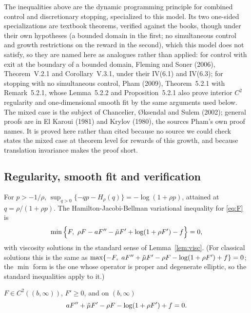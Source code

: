 \begin{aremark}
The inequalities above are the dynamic programming principle for combined control and discretionary stopping, specialized to this model. Its two one-sided specializations are textbook theorems, verified against the books, though under their own hypotheses (a bounded domain in the first; no simultaneous control and growth restrictions on the reward in the second), which this model does not satisfy, so they are named here as analogues rather than applied: for control with exit at the boundary of a bounded domain, Fleming and Soner (2006), Theorem~V.2.1 and Corollary~V.3.1, under their IV(6.1) and IV(6.3); for stopping with no simultaneous control, Pham (2009), Theorem~5.2.1 with Remark~5.2.1, whose Lemma~5.2.2 and Proposition~5.2.1 also prove interior $C^2$ regularity and one-dimensional smooth fit by the same arguments used below. The mixed case is the subject of Chancelier, \O ksendal and Sulem (2002); general proofs are in El Karoui (1981) and Krylov (1980), the sources Pham's own proof names. It is proved here rather than cited because no source we could check states the mixed case at theorem level for rewards of this growth, and because translation invariance makes the proof short.
\end{aremark}

\subsection{Regularity, smooth fit and verification}

For $p>-1/\rho$, $\sup_{q>0}\{-qp-H_\rho(q)\}=-\log(1+\rho p)$, attained at $q=\rho/(1+\rho p)$. The Hamilton-Jacobi-Bellman variational inequality for \eqref{eq:F} is
\begin{equation}
\min\Big\{F,\ \rho F-aF''-\tilde\mu F'+\log(1+\rho F')-f\Big\}=0 , \label{eq:HJB}
\end{equation}
with viscosity solutions in the standard sense of Lemma~\ref{lem:visc}. (For classical solutions this is the same as $\max\{-F,\ aF''+\tilde\mu F'-\rho F-\log(1+\rho F')+f\}=0$; the $\min$ form is the one whose operator is proper and degenerate elliptic, so the standard inequalities apply to it.)

\begin{alemma}\label{lem:reg}
$F\in C^2((b,\infty))$, $F'\ge0$, and on $(b,\infty)$
\begin{equation}
aF''+\tilde\mu F'-\rho F-\log(1+\rho F')+f=0 . \label{eq:ODE}
\end{equation}
\end{alemma}


